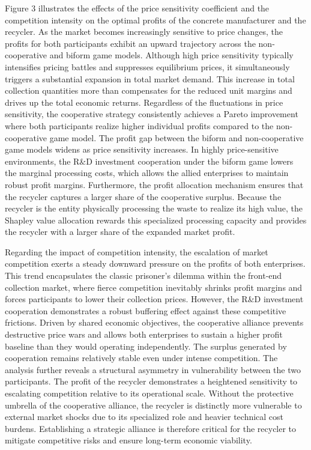 \documentclass[authoryear,preprint,review,times,10pt]{elsarticle}
\begin{document}
Figure 3 illustrates the effects of the price sensitivity coefficient and the competition intensity on the optimal profits of the concrete manufacturer and the recycler. As the market becomes increasingly sensitive to price changes, the profits for both participants exhibit an upward trajectory across the non-cooperative and biform game models. Although high price sensitivity typically intensifies pricing battles and suppresses equilibrium prices, it simultaneously triggers a substantial expansion in total market demand. This increase in total collection quantities more than compensates for the reduced unit margins and drives up the total economic returns. Regardless of the fluctuations in price sensitivity, the cooperative strategy consistently achieves a Pareto improvement where both participants realize higher individual profits compared to the non-cooperative game model. The profit gap between the biform and non-cooperative game models widens as price sensitivity increases. In highly price-sensitive environments, the R\&D investment cooperation under the biform game lowers the marginal processing costs, which allows the allied enterprises to maintain robust profit margins. Furthermore, the profit allocation mechanism ensures that the recycler captures a larger share of the cooperative surplus. Because the recycler is the entity physically processing the waste to realize its high value, the Shapley value allocation rewards this specialized processing capacity and provides the recycler with a larger share of the expanded market profit.

Regarding the impact of competition intensity, the escalation of market competition exerts a steady downward pressure on the profits of both enterprises. This trend encapsulates the classic prisoner's dilemma within the front-end collection market, where fierce competition inevitably shrinks profit margins and forces participants to lower their collection prices. However, the R\&D investment cooperation demonstrates a robust buffering effect against these competitive frictions. Driven by shared economic objectives, the cooperative alliance prevents destructive price wars and allows both enterprises to sustain a higher profit baseline than they would operating independently. The surplus generated by cooperation remains relatively stable even under intense competition. The analysis further reveals a structural asymmetry in vulnerability between the two participants. The profit of the recycler demonstrates a heightened sensitivity to escalating competition relative to its operational scale. Without the protective umbrella of the cooperative alliance, the recycler is distinctly more vulnerable to external market shocks due to its specialized role and heavier technical cost burdens. Establishing a strategic alliance is therefore critical for the recycler to mitigate competitive risks and ensure long-term economic viability.
\end{document}
